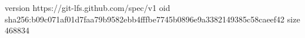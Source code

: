 version https://git-lfs.github.com/spec/v1
oid sha256:b09c071af01d7faa79b9582ebb4fffbe7745b0896e9a3382149385c58caeef42
size 468834
